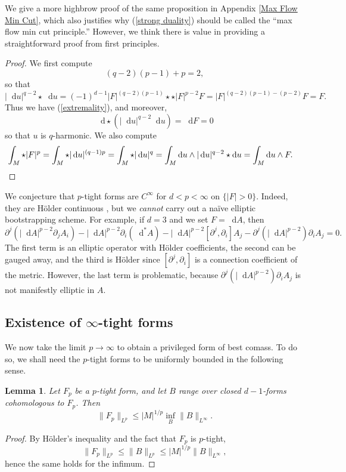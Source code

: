\documentclass[reqno,11pt]{amsart}
\newcommand*\dif{\mathop{}\!\mathrm{d}}
\newtheorem{lemma}[theorem]{Lemma}
\theoremstyle{definition}
\numberwithin{equation}{section}
\begin{document}
We give a more highbrow proof of the same proposition in Appendix \ref{Max Flow Min Cut}, which also justifies why (\ref{strong duality}) should be called the ``max flow min cut principle.''
However, we think there is value in providing a straightforward proof from first principles.

\begin{proof}
We first compute 
$$(q - 2)(p - 1) + p = 2,$$
so that
$$|\dif u|^{q - 2} \star \dif u = (-1)^{d - 1} |F|^{(q - 2)(p - 1)} \star \star |F|^{p - 2} F = |F|^{(q - 2)(p - 1) - (p - 2)} F = F.$$
Thus we have (\ref{extremality}), and moreover,
$$\dif \star (|\dif u|^{q - 2} \dif u) = \dif F = 0$$
so that $u$ is $q$-harmonic.
We also compute 
\begin{align*}
\int_M \star |F|^p &= \int_M \star |\dif u|^{(q - 1)p} = \int_M \star |\dif u|^q = \int_M \dif u \wedge |\dif u|^{q - 2} \star \dif u = \int_M \dif u \wedge F. \qedhere 
\end{align*}
\end{proof}

We conjecture that $p$-tight forms are $C^\infty$ for $d < p < \infty$ on $\{|F| > 0\}$.
Indeed, they are H\"older continuous \cite{Uhlenbeck77}, but we \emph{cannot} carry out a na\"ive elliptic bootstrapping scheme.
For example, if $d = 3$ and we set $F = \dif A$, then
$$\partial^j(|\dif A|^{p - 2} \partial_j A_i) - |\dif A|^{p - 2} \partial_i (\dif^* A) - |\dif A|^{p - 2} [\partial^j, \partial_i] A_j - \partial^j(|\dif A|^{p - 2}) \partial_i A_j = 0.$$
The first term is an elliptic operator with H\"older coefficients, the second can be gauged away, and the third is H\"older since $[\partial^j, \partial_i]$ is a connection coefficient of the metric.
However, the last term is problematic, because $\partial^j(|\dif A|^{p - 2}) \partial_i A_j$ is not manifestly elliptic in $A$.


\subsection{\texorpdfstring{Existence of $\infty$-tight forms}{Existence of infinity-tight forms}}
We now take the limit $p \to \infty$ to obtain a privileged form of best comass.
To do so, we shall need the $p$-tight forms to be uniformly bounded in the following sense.

\begin{lemma}
Let $F_p$ be a $p$-tight form, and let $B$ range over closed $d - 1$-forms cohomologous to $F_p$. Then
\begin{equation}\label{infinity magnetic rules p magnetic}
	\|F_p\|_{L^p} \leq |M|^{1/p} \inf_B \|B\|_{L^\infty}.
\end{equation}
\end{lemma}
\begin{proof}
By H\"older's inequality and the fact that $F_p$ is $p$-tight,
$$\|F_p\|_{L^p} \leq \|B\|_{L^p} \leq |M|^{1/p} \|B\|_{L^\infty},$$
hence the same holds for the infimum.
\end{proof}
\end{document}
